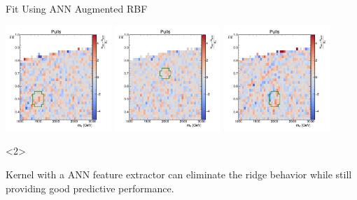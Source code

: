 \documentclass[10pt]{beamer}
\begin{document}
\begin{frame}{Fit Using ANN Augmented RBF}
  \begin{center}
    \includegraphics[width=0.3\textwidth]{figures/2dpullplots/nnrbf_32_16_8/E_1500_0p5_150_0p07.pdf} 
    \includegraphics[width=0.3\textwidth]{figures/2dpullplots/nnrbf_32_16_8/E_2000_0p7_150_0p05.pdf} 
    \includegraphics[width=0.3\textwidth]{figures/2dpullplots/nnrbf_32_16_8/E_2000_0p5_150_0p07.pdf} 
  \end{center}

  \begin{onlyenv}<2>
    \begin{beamerpopover}
      \begin{block}{}
        Kernel with a ANN feature extractor can eliminate the ridge behavior while still providing good predictive performance.
      \end{block}
    \end{beamerpopover}
  \end{onlyenv}
\end{frame}
\end{document}
